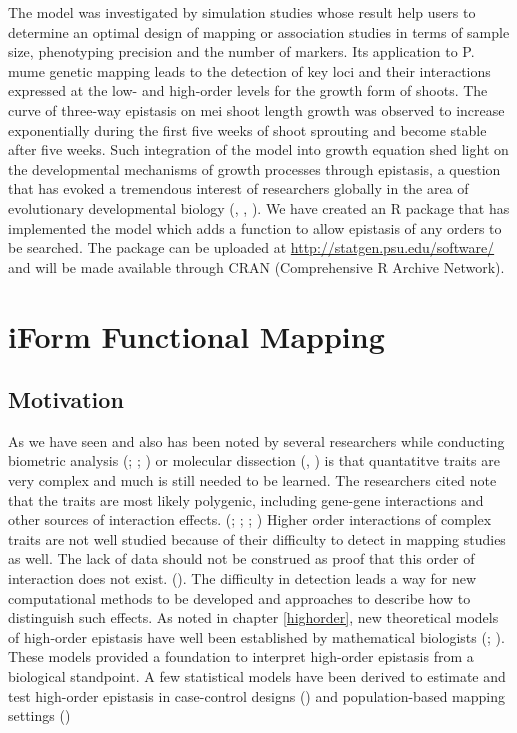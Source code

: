 \documentclass[11pt,]{book}
\theoremstyle{definition}
\theoremstyle{definition}
\theoremstyle{remark}
\begin{document}
The model was investigated by simulation studies whose result help users
to determine an optimal design of mapping or association studies in
terms of sample size, phenotyping precision and the number of markers.
Its application to P. mume genetic mapping leads to the detection of key
loci and their interactions expressed at the low- and high-order levels
for the growth form of shoots. The curve of three-way epistasis on mei
shoot length growth was observed to increase exponentially during the
first five weeks of shoot sprouting and become stable after five weeks.
Such integration of the model into growth equation shed light on the
developmental mechanisms of growth processes through epistasis, a
question that has evoked a tremendous interest of researchers globally
in the area of evolutionary developmental biology
(\cite{franks2007rapid}, \cite{cartolano2015heterochrony},
\cite{nishino2013network}). We have created an R package that has
implemented the model which adds a function to allow epistasis of any
orders to be searched. The package can be uploaded at
\url{http://statgen.psu.edu/software/} and will be made available
through CRAN (Comprehensive R Archive Network).

\hypertarget{iformfunc}{\chapter{iForm Functional
Mapping}\label{iformfunc}}

\section{Motivation}\label{motivation-2}

As we have seen and also has been noted by several researchers while
conducting biometric analysis (\cite{jinks1982biometrical};
\cite{hill2004ds}; \cite{wu1996detecting}) or molecular dissection
(\cite{mackay2009genetics}, \cite{park2010estimation}) is that
quantatitve traits are very complex and much is still needed to be
learned. The researchers cited note that the traits are most likely
polygenic, including gene-gene interactions and other sources of
interaction effects. (\cite{cheverud1995epistasis};
\cite{moore2003ubiquitous}; \cite{van2010detection};
\cite{mackay2014epistasis}) Higher order interactions of complex traits
are not well studied because of their difficulty to detect in mapping
studies as well. The lack of data should not be construed as proof that
this order of interaction does not exist. (\cite{taylor2015higher}). The
difficulty in detection leads a way for new computational methods to be
developed and approaches to describe how to distinguish such effects. As
noted in chapter \ref{highorder}, new theoretical models of high-order
epistasis have well been established by mathematical biologists
(\cite{hansen2001epistasis}; \cite{beerenwinkel2007analysis}). These
models provided a foundation to interpret high-order epistasis from a
biological standpoint. A few statistical models have been derived to
estimate and test high-order epistasis in case-control designs
(\cite{wang2015bayesian}) and population-based mapping settings
(\cite{pang2013statistical})
\end{document}
